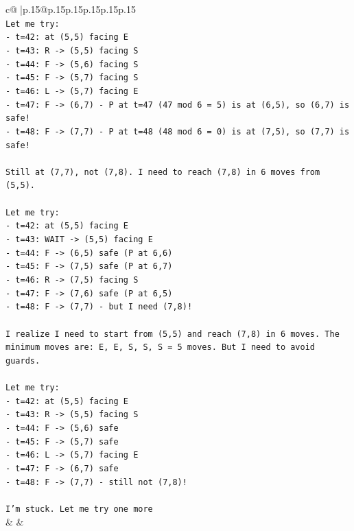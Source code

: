 \documentclass{article}
\begin{document}
{\begin{supertabular}{c@{$\;$}|p{.15\linewidth}@{}p{.15\linewidth}p{.15\linewidth}p{.15\linewidth}p{.15\linewidth}p{.15\linewidth}}
{{{\\ 
\texttt{Let me try:} \\
\texttt{{-} t=42: at (5,5) facing E} \\
\texttt{{-} t=43: R {-}> (5,5) facing S} \\
\texttt{{-} t=44: F {-}> (5,6) facing S} \\
\texttt{{-} t=45: F {-}> (5,7) facing S} \\
\texttt{{-} t=46: L {-}> (5,7) facing E} \\
\texttt{{-} t=47: F {-}> (6,7) {-} P at t=47 (47 mod 6 = 5) is at (6,5), so (6,7) is safe!} \\
\texttt{{-} t=48: F {-}> (7,7) {-} P at t=48 (48 mod 6 = 0) is at (7,5), so (7,7) is safe!} \\
\\ 
\texttt{Still at (7,7), not (7,8). I need to reach (7,8) in 6 moves from (5,5).} \\
\\ 
\texttt{Let me try:} \\
\texttt{{-} t=42: at (5,5) facing E} \\
\texttt{{-} t=43: WAIT {-}> (5,5) facing E} \\
\texttt{{-} t=44: F {-}> (6,5) safe (P at 6,6)} \\
\texttt{{-} t=45: F {-}> (7,5) safe (P at 6,7)} \\
\texttt{{-} t=46: R {-}> (7,5) facing S} \\
\texttt{{-} t=47: F {-}> (7,6) safe (P at 6,5)} \\
\texttt{{-} t=48: F {-}> (7,7) {-} but I need (7,8)!} \\
\\ 
\texttt{I realize I need to start from (5,5) and reach (7,8) in 6 moves. The minimum moves are: E, E, S, S, S = 5 moves. But I need to avoid guards.} \\
\\ 
\texttt{Let me try:} \\
\texttt{{-} t=42: at (5,5) facing E} \\
\texttt{{-} t=43: R {-}> (5,5) facing S} \\
\texttt{{-} t=44: F {-}> (5,6) safe} \\
\texttt{{-} t=45: F {-}> (5,7) safe} \\
\texttt{{-} t=46: L {-}> (5,7) facing E} \\
\texttt{{-} t=47: F {-}> (6,7) safe} \\
\texttt{{-} t=48: F {-}> (7,7) {-} still not (7,8)!} \\
\\ 
\texttt{I'm stuck. Let me try one more} \\
            }
        }
    }
    & & \\ \\


\end{supertabular}}
\end{document}
